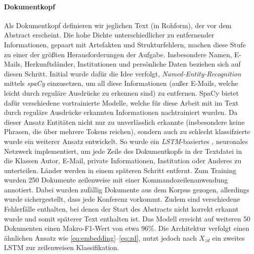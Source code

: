 \documentclass[bachelor,german]{info1thesis}
\begin{document}
\paragraph{Dokumentkopf} Als Dokumentkopf definieren wir jeglichen Text (in Rohform), der vor dem Abstract erscheint. Die hohe Dichte unterschiedlicher zu entfernender Informationen, gepaart mit Artefakten und Strukturfehlern, machen diese Stufe zu einer der größten Herausforderungen der Aufgabe. Insbesondere Namen, E-Mails, Herkunftsländer, Institutionen und persönliche Daten beziehen sich auf diesen Schritt. Initial wurde dafür die Idee verfolgt, \textit{Named-Entity-Recognition} mittels \textit{spaCy} \cite{Honnibal2017} einzusetzen, um all diese Informationen (außer E-Mails, welche leicht durch reguläre Ausdrücke zu erkennen sind) zu entfernen. SpaCy bietet dafür verschiedene vortrainierte Modelle, welche für diese Arbeit mit im Text durch reguläre Ausdrücke erkannten Informationen nachtrainiert wurden. Da dieser Ansatz Entitäten nicht nur zu unverlässlich erkannte (insbesondere keine Phrasen, die über mehrere Tokens reichen), sondern auch zu schlecht klassifzierte wurde ein weiterer Ansatz entwickelt. So wurde ein \textit{LSTM}-basiertes \cite{Hochreiter1997}, neuronales Netzwerk implementiert, um jede Zeile des Dokumentkopfs in der Textdatei in die Klassen Autor, E-Mail, private Informationen, Institution oder Anderes zu unterteilen. Länder werden in einem späteren Schritt entfernt.  Zum Training wurden 250 Dokumente zeilenweise mit einer Kommandozeilenanwendung annotiert. Dabei wurden zufällig Dokumente aus dem Korpus gezogen, allerdings wurde sichergestellt, dass jede Konferenz vorkommt. Zudem sind verschiedene Fehlerfälle enthalten, bei denen der Start des Abstracts nicht korrekt erkannt wurde und somit späterer Text enthalten ist. Das Modell erreicht auf weiteren 50 Dokumenten einen Makro-F1-Wert von etwa 96\%. Die Architektur verfolgt einen ähnlichen Ansatz wie \autoref{eq:embedding}--\ref{eq:zd}, nutzt jedoch nach $X_{zd}$ ein zweites LSTM zur zeilenweisen Klassifikation.
\end{document}
